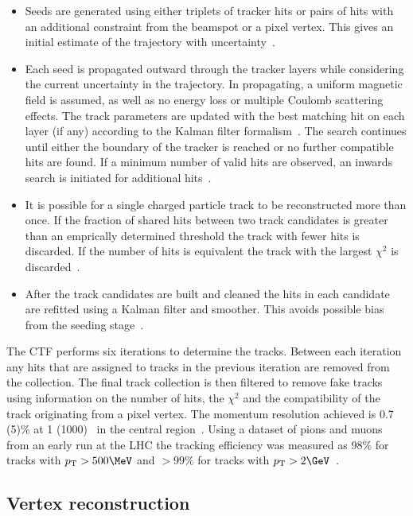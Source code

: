 \begin{itemize}
\item Seeds are generated using either triplets of tracker hits or pairs of hits with an additional constraint 
from the beamspot or a pixel vertex. This gives an initial estimate of the trajectory with uncertainty~\cite{tracker_early}.
\item Each seed is propagated outward through the tracker layers while considering the current uncertainty in the trajectory.
In propagating, a uniform magnetic field is assumed, as well as no energy loss or multiple Coulomb scattering effects.
The track parameters are updated with the best matching hit on each layer (if any) according to the Kalman filter formalism~\cite{tracker_vertex}.
The search continues until either the boundary of the tracker is reached or no further compatible hits are found. If a minimum number
of valid hits are observed, an inwards search is initiated for additional hits~\cite{tracker_early}.
\item It is possible for a single charged particle track to be reconstructed more than once. If the fraction of shared hits 
between two track candidates is greater than an emprically determined threshold the track with fewer hits is discarded. 
If the number of hits is equivalent the track with the largest $\chi^2$ is discarded~\cite{tracker_vertex}.
\item After the track candidates are built and cleaned the hits in each candidate are refitted using a Kalman filter and smoother. This 
avoids possible bias from the seeding stage~\cite{tracker_vertex}.
\end{itemize}

The CTF performs six iterations to determine the tracks. Between each iteration any hits that are assigned to tracks in the
previous iteration are removed from the collection. The final track collection is then filtered to remove fake tracks using 
information on the number of hits, the $\chi^2$ and the compatibility of the track originating from a pixel vertex. The momentum 
resolution achieved is 0.7 (5)\% at 1 (1000) \GeV~in the central region~\cite{tracker_early}. Using a dataset of pions and muons from an early run 
at the LHC the tracking efficiency was measured as 98\% for tracks with $\pt > 500\MeV$ and $>99\%$ for tracks with $\pt > 2\GeV$~\cite{tracker_eff}.

\subsection{Vertex reconstruction}

